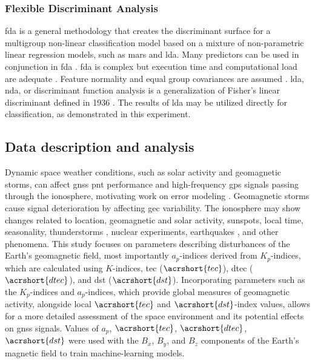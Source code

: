 \let\LaTeXcline\cline\documentclass[sn-mathphys-num]{sn-jnl}\let\cline\LaTeXcline
\begin{document}
\subsubsection{Flexible Discriminant Analysis}

\acrfull{fda} is a general methodology that creates the discriminant surface for a multigroup non-linear classification model \cite{mclachlan2005discriminant} based on a mixture of non-parametric linear regression models, such as \acrfull{mars} and \acrfull{lda}. Many predictors can be used in conjunction in \acrshort{fda} \cite{HastieTibshirani2009}. \acrshort{fda} is complex but execution time and computational load are adequate \cite{reynes2006choice}. Feature normality and equal group covariances are assumed \cite{wetcher2011analyzing}. \acrshort{lda}, \acrfull{nda}, or discriminant function analysis \cite{cohen2013applied} is a generalization of Fisher's linear discriminant defined in 1936 \cite{mclachlan2005discriminant}. The results of \acrshort{lda} may be utilized directly for classification, as demonstrated in this experiment.

\subsection{Data description and analysis}

Dynamic space weather conditions, such as solar activity and geomagnetic storms, can affect  \acrshort{gnss} \acrshort{pnt} performance and high-frequency \acrshort{gps} signals passing through the ionosphere, motivating work on error modeling \cite{zolesi2014ionospheric}. Geomagnetic storms cause signal deterioration by affecting \acrfull{gec} variability. The ionosphere may show changes related to location, geomagnetic and solar activity, sunspots, local time, seasonality, thunderstorms \cite{vellinov1992ionospheric}, nuclear experiments, earthquakes \cite{liu20142013}, and other phenomena. This study focuses on parameters describing disturbances of the Earth's geomagnetic field, most importantly $a_{p}$-indices derived from $K_{p}$-indices, which are calculated using $K$-indices, \acrlong{tec} ($\acrshort{tec}$), \acrlong{dtec} ($\acrshort{dtec}$), and \acrlong{dst} ($\acrshort{dst}$). Incorporating parameters such as the $K_{p}$-indices and $a_{p}$-indices, which provide global measures of geomagnetic activity, alongside local $\acrshort{tec}$ and $\acrshort{dst}$-index values, allows for a more detailed assessment of the space environment and its potential effects on \acrshort{gnss} signals. Values of $a_{p}$, $\acrshort{tec}$, $\acrshort{dtec}$, $\acrshort{dst}$ were used with the $B_x$, $B_y$, and $B_z$ components of the Earth's magnetic field to train machine-learning models.
\end{document}
